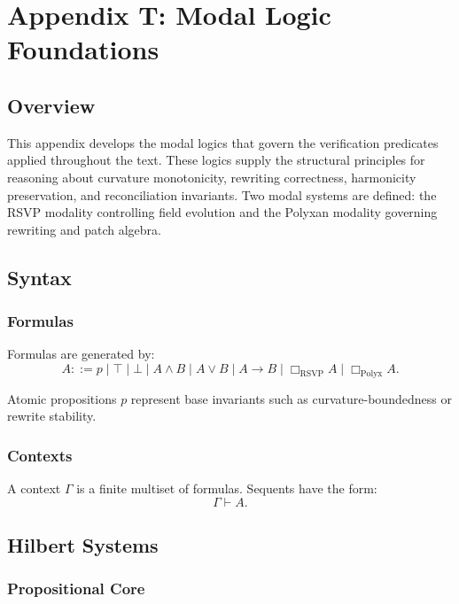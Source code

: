 \chapter*{Appendix T: Modal Logic Foundations}

\section{Overview}

This appendix develops the modal logics that govern the verification predicates applied throughout the text. These logics supply the structural principles for reasoning about curvature monotonicity, rewriting correctness, harmonicity preservation, and reconciliation invariants. Two modal systems are defined: the RSVP modality controlling field evolution and the Polyxan modality governing rewriting and patch algebra.

\section{Syntax}

\subsection{Formulas}

Formulas are generated by:
\[
A ::= p \mid \top \mid \bot \mid A \wedge B \mid A \vee B \mid A \to B \mid \Box_{\mathrm{RSVP}} A \mid \Box_{\mathrm{Polyx}} A.
\]

Atomic propositions $p$ represent base invariants such as curvature-boundedness or rewrite stability.

\subsection{Contexts}

A context $\Gamma$ is a finite multiset of formulas. Sequents have the form:
\[
\Gamma \vdash A.
\]

\section{Hilbert Systems}

\subsection{Propositional Core}

